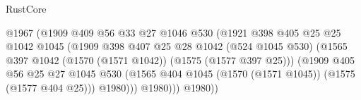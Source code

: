 \begin{lexlean}{RustCore}
\begin{coremodule}
                                                  @1967
                                                  (@1909
                                                    @409
                                                    @56
                                                    @33
                                                    @27
                                                    @1046
                                                    @530
                                                    (@1921
                                                      @398
                                                      @405
                                                      @25
                                                      @25
                                                      @1042
                                                      @1045
                                                      (@1909
                                                        @398
                                                        @407
                                                        @25
                                                        @28
                                                        @1042
                                                        (@524 @1045 @530)
                                                        (@1565
                                                          @397
                                                          @1042
                                                          (@1570 (@1571 @1042))
                                                          (@1575 (@1577 @397 @25)))
                                                        (@1909
                                                          @405
                                                          @56
                                                          @25
                                                          @27
                                                          @1045
                                                          @530
                                                          (@1565
                                                            @404
                                                            @1045
                                                            (@1570 (@1571 @1045))
                                                            (@1575 (@1577 @404 @25)))
                                                          @1980)))
                                                    @1980)))
                                              @1980))

\end{coremodule}
\end{lexlean}
